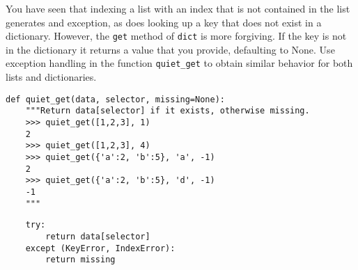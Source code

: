 \begin{blocksection}
\question You have seen that indexing a list with an index that is not contained in the list generates and exception, as does looking up a key that does not exist in a dictionary. However, the \texttt{get} method of \texttt{dict} is more forgiving. If the key is not in the dictionary it returns a value that you provide, defaulting to None. Use exception handling in the function \texttt{quiet\_get} to obtain similar behavior for both lists and dictionaries.

\begin{lstlisting}
def quiet_get(data, selector, missing=None):
    """Return data[selector] if it exists, otherwise missing.
    >>> quiet_get([1,2,3], 1)
    2
    >>> quiet_get([1,2,3], 4)
    >>> quiet_get({'a':2, 'b':5}, 'a', -1)
    2
    >>> quiet_get({'a':2, 'b':5}, 'd', -1)
    -1
    """
\end{lstlisting}
\begin{solution}
\begin{lstlisting}
    try:
        return data[selector]
    except (KeyError, IndexError):
        return missing
\end{lstlisting}
\end{solution}
\end{blocksection}